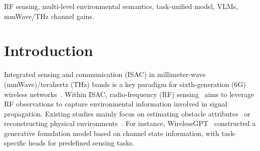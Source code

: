 \documentclass[journal,10pt,twocolumn]{IEEEtran}
\begin{document}
\begin{abstract}
This letter investigates a task-unified multi-level radio-frequency (RF) sensing framework driven by vision–language models (VLMs). Existing RF sensing methods rely on task-specific designs and provide only partial environmental information, limiting their ability to handle emerging 6G applications. To address this, we formulate the RF sensing problem as a captioning task, mapping millimeter-wave (mmWave)/terahertz (THz) channel gains to captions describing multi-level environmental semantics. The framework solves this problem by fine-tuning a VLM, leveraging its knowledge-rich multimodal representations and prompt-conditioned semantic generation capabilities. Hence, different sensing tasks are specified through textual prompts, enabling the framework to handle diverse tasks in a unified manner. For fine-tuning, we introduce prompt-routed low-rank adaptation (LoRA) experts to achieve level-aware adaptation, thereby mitigating the discrepancy between propagation characteristics and visual–textual priors. Simulation results show that the proposed framework achieves up to 0.31 improvement in F1 score over the baselines, indicating better sensing performance in terms of precision and recall.



\end{abstract}

\begin{IEEEkeywords}
RF sensing, multi-level environmental semantics, task-unified model, VLMs, mmWave/THz channel gains.
\end{IEEEkeywords}

\section{Introduction}
\label{sec:intro}


Integrated sensing and communication (ISAC) in millimeter-wave (mmWave)/terahertz (THz) bands is a key paradigm for sixth-generation (6G) wireless networks~\cite{10494372}. Within ISAC, radio-frequency (RF) sensing~\cite{10907867} aims to leverage RF observations to capture environmental information involved in signal propagation. Existing studies mainly focus on estimating obstacle attributes~\cite{11278185,9448728} or reconstructing physical environments~\cite{hu2025advancing,11278185}. For instance, WirelessGPT~\cite{11278185} constructed a generative foundation model based on channel state information, with task-specific heads for predefined sensing tasks. 
\end{document}
